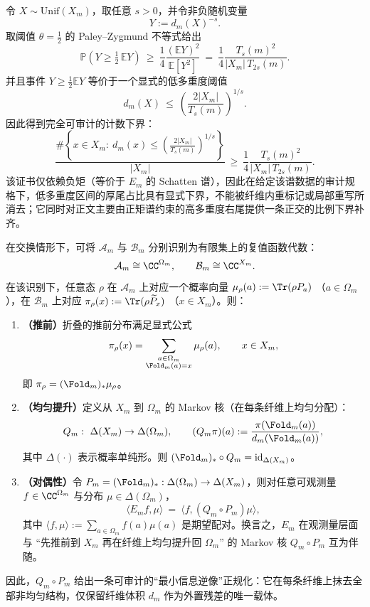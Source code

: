 \begin{theorem}\label{prop:fold-negative-moment-left-tail-certificate}
令 \(X\sim \mathrm{Unif}(X_m)\)，取任意 \(s>0\)，并令非负随机变量
\[
Y:=d_m(X)^{-s}.
\]
取阈值 \(\theta=\tfrac12\) 的 Paley--Zygmund 不等式给出
\[
\mathbb P\!\left(Y\ge \tfrac12\,\mathbb EY\right)
\ \ge\
\frac{1}{4}\frac{(\mathbb EY)^2}{\mathbb E[Y^2]}
\ =\
\frac{1}{4}\frac{T_s(m)^2}{|X_m|\,T_{2s}(m)}.
\]
并且事件 \(Y\ge \tfrac12\mathbb EY\) 等价于一个显式的低多重度阈值
\[
d_m(X)\ \le\ \left(\frac{2|X_m|}{T_s(m)}\right)^{1/s}.
\]
因此得到完全可审计的计数下界：
\[
\boxed{
\frac{\#\left\{x\in X_m:\ d_m(x)\le \left(\frac{2|X_m|}{T_s(m)}\right)^{1/s}\right\}}{|X_m|}
\ \ge\
\frac{1}{4}\frac{T_s(m)^2}{|X_m|\,T_{2s}(m)}.
}
\]
该证书仅依赖负矩（等价于 \(E_m\) 的 Schatten 谱），因此在给定该谱数据的审计规格下，低多重度区间的厚尾占比具有显式下界，不能被纤维内重标记或局部重写所消去；它同时对正文主要由正矩谱约束的高多重度右尾提供一条正交的比例下界补齐。
\end{theorem}



\begin{theorem}\label{prop:fold-pushforward-lift}
在交换情形下，可将 $\mathcal{A}_m$ 与 $\mathcal{B}_m$ 分别识别为有限集上的复值函数代数：
\[
\mathcal{A}_m\cong \CC^{\Omega_m},\qquad
\mathcal{B}_m\cong \CC^{X_m}.
\]
在该识别下，任意态 $\rho$ 在 $\mathcal{A}_m$ 上对应一个概率向量
\(
\mu_\rho(a):=\Tr(\rho P_a)
\)
（$a\in\Omega_m$），在 $\mathcal{B}_m$ 上对应
\(
\pi_\rho(x):=\Tr(\rho \widetilde P_x)
\)
（$x\in X_m$）。则：
\begin{enumerate}
  \item \textbf{（推前）}折叠的推前分布满足显式公式
  \[
  \pi_\rho(x)=\sum_{\substack{a\in\Omega_m\\ \Fold_m(a)=x}}\mu_\rho(a),
  \qquad x\in X_m,
  \]
  即 $\pi_\rho=(\Fold_m)_*\mu_\rho$。
  \item \textbf{（均匀提升）}定义从 $X_m$ 到 $\Omega_m$ 的 Markov 核（在每条纤维上均匀分配）：
  \[
  Q_m:\ \Delta(X_m)\to\Delta(\Omega_m),\qquad
  (Q_m\pi)(a):=\frac{\pi(\Fold_m(a))}{d_m(\Fold_m(a))},
  \]
  其中 $\Delta(\cdot)$ 表示概率单纯形。则 $(\Fold_m)_*\circ Q_m=\mathrm{id}_{\Delta(X_m)}$。
  \item \textbf{（对偶性）}令 $P_m=(\Fold_m)_*:\Delta(\Omega_m)\to\Delta(X_m)$，则对任意可观测量 $f\in \CC^{\Omega_m}$ 与分布 $\mu\in\Delta(\Omega_m)$，
  \[
  \langle E_m f,\mu\rangle\ =\ \langle f,(Q_m\circ P_m)\mu\rangle,
  \]
  其中 $\langle f,\mu\rangle:=\sum_{a\in\Omega_m} f(a)\mu(a)$ 是期望配对。换言之，$E_m$ 在观测量层面与 “先推前到 $X_m$ 再在纤维上均匀提升回 $\Omega_m$” 的 Markov 核 $Q_m\circ P_m$ 互为伴随。
\end{enumerate}
因此，$Q_m\circ P_m$ 给出一条可审计的“最小信息逆像”正规化：它在每条纤维上抹去全部非均匀结构，仅保留纤维体积 $d_m$ 作为外置残差的唯一载体。
\end{theorem}

